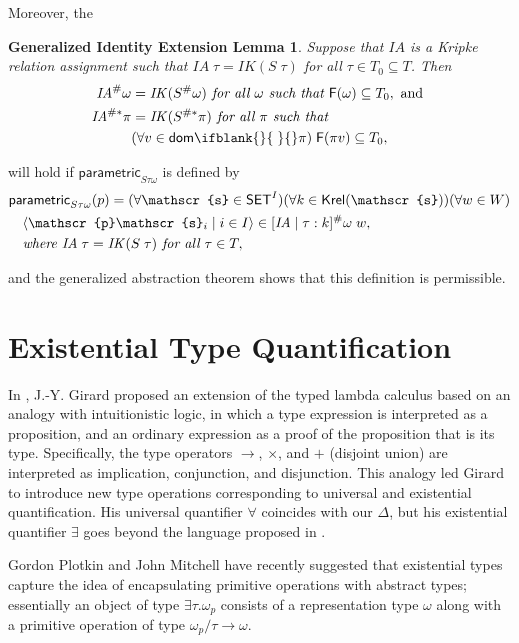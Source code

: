 \documentclass[sigplan,screen,nonacm,balance=false]{acmart}
\theoremstyle{plain}
\DeclarePairedDelimiter{\pair}{\langle}{\rangle}
\newcommand{\dom}[1]{\mathsf{dom}\ifblank{#1}{\;}{#1}}
\newcommand{\FV}{\mathsf{F}}
\newcommand{\SET}{\mathsf{SET}}
\newcommand{\para}{\mathsf{parametric}}
\newcommand{\Krel}{\mathsf{Krel}}
\newcommand{\IA}{\mathit{IA}}
\newcommand{\IK}{\mathit{IK}}
\newcommand{\scrs}{\mathscr{s}}
\newcommand{\scrp}{\mathscr{p}}
\begin{document}
Moreover, the

\newtheorem*{genIEL}{Generalized Identity Extension Lemma}
\begin{genIEL}
  Suppose that $\IA$ is a Kripke relation assignment such that $\IA \; \tau = \IK(S \; \tau)$ for all $\tau \in T_0 \subseteq T$.
  Then
  \begin{align*}
    \IA^\# \omega &= \IK(S^\# \omega) \textit{ for all } \omega \textit{ such that } \FV(\omega) \subseteq T_0, \text{ and } \\
    \IA^{\#*} \pi &= \IK(S^{\#*} \pi) \textit{ for all } \pi \textit{ such that } \\
    & (\forall v \in \dom{} \pi) \; \FV(\pi v) \subseteq T_0,
  \end{align*}
\end{genIEL}

will hold if $\para_{S \tau \omega}$ is defined by
%
\begin{align*}
  & \para_{S \tau \omega}(p) =
  (\forall \scrs \in \SET^I) (\forall k \in \Krel(\scrs)) (\forall w \in W) \\
  & \quad \pair{\scrp \scrs_i \mid i \in I} \in [\IA \mid \tau: k]^\# \omega \; w, \\
  & \quad \textit{where } \IA \; \tau = \IK(S \; \tau) \textit{ for all } \tau \in T,
\end{align*}

and the generalized abstraction theorem shows that this definition is permissible.

\section{Existential Type Quantification}

In \citep{SystemF}, J.-Y. Girard proposed an extension of the typed lambda calculus based on an analogy with intuitionistic logic, in which a type expression is interpreted as a proposition, and an ordinary expression as a proof of the proposition that is its type.
Specifically, the type operators $\to$, $\times$, and $+$ (disjoint union) are interpreted as implication, conjunction, and disjunction.
This analogy led Girard to introduce new type operations corresponding to universal and existential quantification.
His universal quantifier $\forall$ coincides with our $\Delta$, but his existential quantifier $\exists$ goes beyond the language proposed in \citep{polymorphism}.

Gordon Plotkin and John Mitchell have recently suggested that existential types capture the idea of encapsulating primitive operations with abstract types; essentially an object of type $\exists \tau. \omega_p$ consists of a representation type $\omega$ along with a primitive operation of type $\omega_p/\tau \to \omega$.
\end{document}
